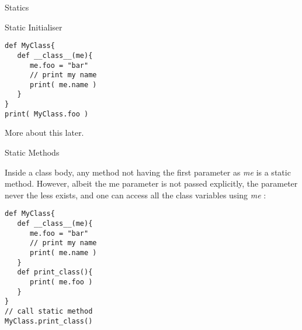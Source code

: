 \begin{section}{Statics}
\begin{subsection}{Static Initialiser}
\begin{center}\begin{minipage}{\linewidth}
\begin{lstlisting}[style=JexlStyle]
def MyClass{
   def __class__(me){
      me.foo = "bar"
      // print my name 
      print( me.name )
   }
}
print( MyClass.foo )
\end{lstlisting}  
\end{minipage}\end{center}

More about this later.

\end{subsection}

\begin{subsection}{Static Methods}

Inside a class body, any method not having the first parameter
as \emph{me} is a static method. However, albeit the me parameter
is not passed explicitly, the parameter never the less exists,
and one can access all the class variables using \emph{me} :

\begin{center}\begin{minipage}{\linewidth}
\begin{lstlisting}[style=JexlStyle]
def MyClass{
   def __class__(me){
      me.foo = "bar"
      // print my name 
      print( me.name )
   }
   def print_class(){
      print( me.foo )      
   }
}
// call static method 
MyClass.print_class()
\end{lstlisting}  
\end{minipage}\end{center}

\end{subsection}

\end{section}


